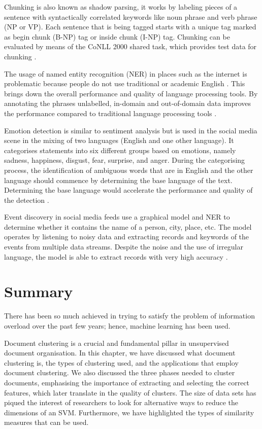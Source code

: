 Chunking is also known as shadow parsing, it works by labeling pieces of a sentence with syntactically correlated keywords like noun phrase and verb phrase (NP or VP). Each sentence that is being tagged starts with a unique tag marked as begin chunk (B-NP) tag or inside chunk (I-NP) tag. Chunking can be evaluated by means of the CoNLL 2000 shared task, which provides test data for chunking \cite{sang2000introduction}. 

The usage of named entity recognition (NER) in places such as the internet is problematic because people do not use traditional or academic English \cite{nadeau2007survey}. This brings down the overall performance and quality of language processing tools. By annotating the phrases unlabelled, in-domain and out-of-domain data improves the performance compared to traditional language processing tools \cite{katiyar-cardie-2018-nested}.

Emotion detection is similar to sentiment analysis but is used in the social media scene in the mixing of two languages (English and one other language). It categorises statements into six different groups based on emotions, namely sadness, happiness, disgust, fear, surprise, and anger. During the categorising process, the identification of ambiguous words that are in English and the other language should commence by determining the base language of the text. Determining the base language would accelerate the performance and quality of the detection \cite{khurana2017natural}.

Event discovery in social media feeds use a graphical model and NER to determine whether it contains the name of a person, city, place, etc. The model operates by listening to noisy data and extracting records and keywords of the events from multiple data streams. Despite the noise and the use of irregular language, the model is able to extract records with very high accuracy \cite{benson2011event}.

\section{Summary}

There has been so much achieved in trying to satisfy the problem of information overload over the past few years; hence, machine learning has been used.

Document clustering is a crucial and fundamental pillar in unsupervised document organisation. In this chapter, we have discussed what document clustering is, the types of clustering used, and the applications that employ document clustering. We also discussed the three phases needed to cluster documents, emphasising the importance of extracting and selecting the correct features, which later translate in the quality of clusters. The size of data sets has piqued the interest of researchers to look for alternative ways to reduce the dimensions of an SVM. Furthermore, we have highlighted the types of similarity measures that can be used. 

